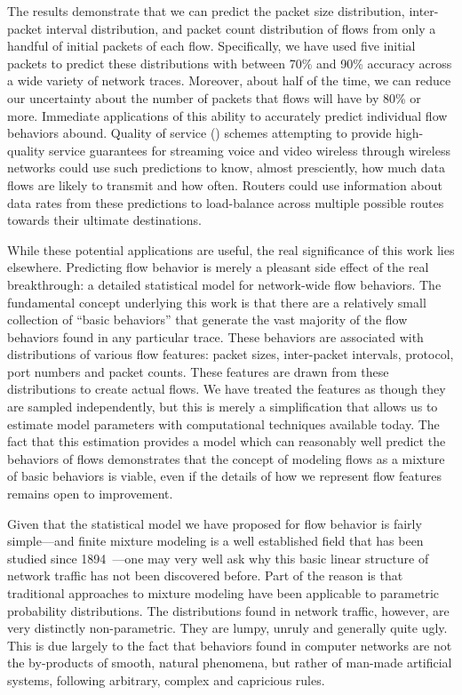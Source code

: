 \documentclass{acm_proc_article-sp}
\begin{document}
The results demonstrate that we can predict the packet size distribution, inter-packet interval distribution, and packet count distribution of flows from only a handful of initial packets of each flow.
Specifically, we have used five initial packets to predict these distributions with between 70\% and 90\% accuracy across a wide variety of network traces.
Moreover, about half of the time, we can reduce our uncertainty about the number of packets that flows will have by 80\% or more.
Immediate applications of this ability to accurately predict individual flow behaviors abound.
Quality of service () schemes attempting to provide high-quality service guarantees for streaming voice and video wireless through wireless networks could use such predictions to know, almost presciently, how much data flows are likely to transmit and how often.
Routers could use information about data rates from these predictions to load-balance across multiple possible routes towards their ultimate destinations.

While these potential applications are useful, the real significance of this work lies elsewhere.
Predicting flow behavior is merely a pleasant side effect of the real breakthrough:
a detailed statistical model for network-wide flow behaviors.
The fundamental concept underlying this work is that there are a relatively small collection of ``basic behaviors'' that generate the vast majority of the flow behaviors found in any particular trace.
These behaviors are associated with distributions of various flow features:
packet sizes, inter-packet intervals,  protocol, port numbers and packet counts.
These features are drawn from these distributions to create actual flows.
We have treated the features as though they are sampled independently, but this is merely a simplification that allows us to estimate model parameters with computational techniques available today.
The fact that this estimation provides a model which can reasonably well predict the behaviors of flows demonstrates that the concept of modeling flows as a mixture of basic behaviors is viable, even if the details of how we represent flow features remains open to improvement.

Given that the statistical model we have proposed for flow behavior is fairly simple---and finite mixture modeling is a well established field that has been studied since 1894~\cite{McLachlan00}---one may very well ask why this basic linear structure of network traffic has not been discovered before.
Part of the reason is that traditional approaches to mixture modeling have been applicable to parametric probability distributions.
The distributions found in network traffic, however, are very distinctly non-parametric.
They are lumpy, unruly and generally quite ugly.
This is due largely to the fact that behaviors found in computer networks are not the by-products of smooth, natural phenomena, but rather of man-made artificial systems, following arbitrary, complex and capricious rules.
\end{document}
